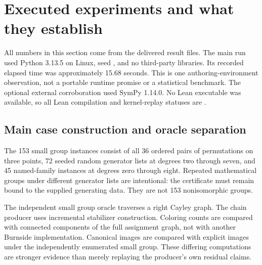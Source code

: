 \section{Executed experiments and what they establish}
\label{sec:experiments}
All numbers in this section come from the delivered result files. The main run used Python 3.13.5 on Linux, seed , and no third-party libraries. Its recorded elapsed time was approximately 15.68 seconds. This is one authoring-environment observation, not a portable runtime promise or a statistical benchmark. The optional external corroboration used SymPy 1.14.0. No Lean executable was available, so all Lean compilation and kernel-replay statuses are .

\subsection{Main case construction and oracle separation}
The 153 small group instances consist of all 36 ordered pairs of permutations on three points, 72 seeded random generator lists at degrees two through seven, and 45 named-family instances at degrees zero through eight. Repeated mathematical groups under different generator lists are intentional: the certificate must remain bound to the supplied generating data. They are not 153 nonisomorphic groups.

The independent small group oracle traverses a right Cayley graph. The chain producer uses incremental stabilizer construction. Coloring counts are compared with connected components of the full assignment graph, not with another Burnside implementation. Canonical images are compared with explicit images under the independently enumerated small group. These differing computations are stronger evidence than merely replaying the producer's own residual claims.

